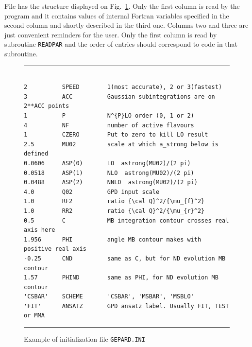 \documentclass[12pt]{article}
\begin{document}
File has the structure displayed on Fig.~\ref{fig:GEPARD.INI}.
Only the first column is read by the program and it contains
values of internal Fortran variables specified in the second column and
shortly described in the third one. 
Columns two and three are just convenient reminders for the user. 
Only the first column is read by subroutine \texttt{READPAR} and the
order of entries should correspond to code in that subroutine.  
\begin{figure}[t]
\begin{center}
\hrule
\begin{verbatim}

2          SPEED        1(most accurate), 2 or 3(fastest)
3          ACC          Gaussian subintegrations are on 2**ACC points 
1          P            N^{P}LO order (0, 1 or 2)
4          NF           number of active flavours
1          CZERO        Put to zero to kill LO result
2.5        MU02         scale at which a_strong below is defined
0.0606     ASP(0)       LO  astrong(MU02)/(2 pi)
0.0518     ASP(1)       NLO  astrong(MU02)/(2 pi)
0.0488     ASP(2)       NNLO  astrong(MU02)/(2 pi)
4.0        Q02          GPD input scale
1.0        RF2          ratio {\cal Q}^2/{\mu_{f}^2}
1.0        RR2          ratio {\cal Q}^2/{\mu_{r}^2}
0.5        C            MB integration contour crosses real axis here
1.956      PHI          angle MB contour makes with positive real axis
-0.25      CND          same as C, but for ND evolution MB contour
1.57       PHIND        same as PHI, for ND evolution MB contour
'CSBAR'    SCHEME       'CSBAR', 'MSBAR', 'MSBLO'
'FIT'      ANSATZ       GPD ansatz label. Usually FIT, TEST or MMA

\end{verbatim}
\hrule
\end{center}
\caption{Example of initialization file \texttt{GEPARD.INI}}
\label{fig:GEPARD.INI}
\end{figure}
\end{document}
